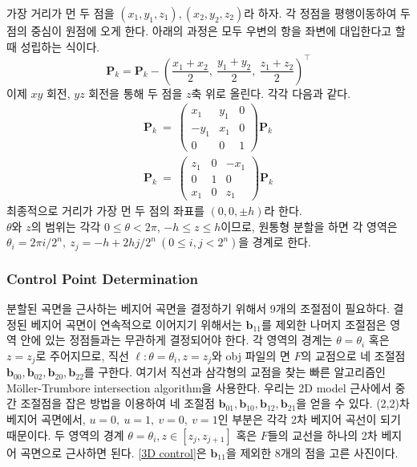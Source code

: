 \documentclass{gshs_thesis}
\theoremstyle{theorem}
\theoremstyle{lemma}
\theoremstyle{definition}
\begin{document}
가장 거리가 먼 두 점을 $(x_1, y_1, z_1), (x_2, y_2, z_2)$라 하자. 각 정점을 평행이동하여 두 점의 중심이 원점에 오게 한다. 아래의 과정은 모두 우변의 항을 좌변에 대입한다고 할 때 성립하는 식이다.
\begin{equation*}
	\mathbf{P}_k = 
	 \mathbf{P}_k - \left(\frac{x_1+x_2}2,\ \frac{y_1+y_2}2,\ \frac{z_1+z_2}2\right)^\intercal
\end{equation*}
이제 $xy$ 회전, $yz$ 회전을 통해 두 점을 $z$축 위로 올린다. 각각 다음과 같다. 
\begin{align*}
	\mathbf{P}_k\ =\ \begin{pmatrix}
		x_1 & y_1 & 0 \\ -y_1 & x_1 & 0 \\ 0 & 0 & 1
	\end{pmatrix} \mathbf{P}_k \\
	\mathbf{P}_k\ =\ \begin{pmatrix}
		z_1 & 0 & -x_1 \\ 0 & 1 & 0 \\ x_1 & 0 & z_1
	\end{pmatrix} \mathbf{P}_k
\end{align*}
최종적으로 거리가 가장 먼 두 점의 좌표를 $(0, 0, \pm h)$라 한다. \\

$\theta$와 $z$의 범위는 각각 $0\leq \theta <2\pi$, $-h \leq z \leq h$이므로, 원통형 분할을 하면 각 영역은 $\theta_i=2\pi i/2^n,\ z_j=-h+2hj/2^n\ (0\leq i, j < 2^n)$을 경계로 한다. 

\subsubsection{Control Point Determination}\label{2.2}
분할된 곡면을 근사하는 베지어 곡면을 결정하기 위해서 9개의 조절점이 필요하다. 결정된 베지어 곡면이 연속적으로 이어지기 위해서는 $\mathbf{b}_{11}$를 제외한 나머지 조절점은 영역 안에 있는 정점들과는 무관하게 결정되어야 한다. 각 영역의 경계는 $\theta=\theta_i$ 혹은 $z=z_j$로 주어지므로, 직선 $\ell \colon \theta=\theta_i, z=z_j$와 obj 파일의 면 $F$의 교점으로 네 조절점 $\mathbf{b}_{00}, \mathbf{b}_{02}, \mathbf{b}_{20}, \mathbf{b}_{22}$를 구한다. 여기서 직선과 삼각형의 교점을 찾는 빠른 알고리즘인 Möller-Trumbore intersection algorithm을 사용한다.\cite{raytriangle} 우리는 2D model 근사에서 중간 조절점을 잡은 방법을 이용하여 네 조절점 $\mathbf{b}_{01}, \mathbf{b}_{10}, \mathbf{b}_{12}, \mathbf{b}_{21}$을 얻을 수 있다. (2,2)차 베지어 곡면에서, $u=0,\ u=1,\ v=0,\ v=1$인 부분은 각각 2차 베지어 곡선이 되기 때문이다. 두 영역의 경계 $\theta=\theta_i, z\in[z_j, z_{j+1}]$ 혹은 $F$들의 교선을 하나의 2차 베지어 곡면으로 근사하면 된다. \cref{3D control}은 $\mathbf{b}_{11}$을 제외한 8개의 점을 고른 사진이다.
\end{document}

